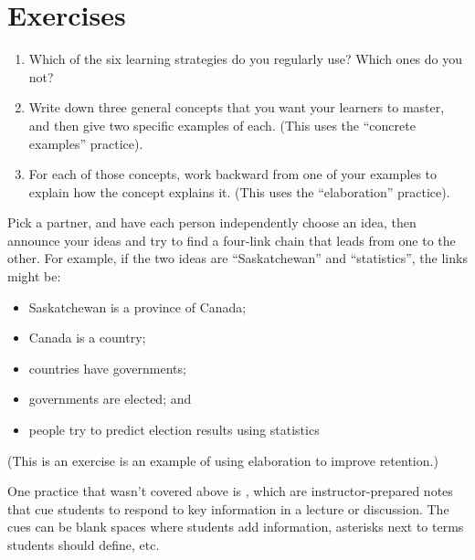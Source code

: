 \section{Exercises}\label{s:individual-exercises}


\begin{enumerate}

\item
  Which of the six learning strategies do you regularly use? Which
  ones do you not?

\item
  Write down three general concepts that you want your learners to
  master, and then give two specific examples of each. (This uses the
  ``concrete examples'' practice).

\item
  For each of those concepts, work backward from one of your examples
  to explain how the concept explains it. (This uses the
  ``elaboration'' practice).

\end{enumerate}


Pick a partner, and have each person independently choose an idea,
then announce your ideas and try to find a four-link chain that leads
from one to the other.  For example, if the two ideas are
``Saskatchewan'' and ``statistics'', the links might be:

\begin{itemize}
\item
  Saskatchewan is a province of Canada;
\item
  Canada is a country;
\item
  countries have governments;
\item
  governments are elected; and
\item
  people try to predict election results using statistics
\end{itemize}

(This is an exercise is an example of using elaboration to improve
retention.)


One practice that wasn't covered above is
, which are instructor-prepared
notes that cue students to respond to key information in a lecture or
discussion.  The cues can be blank spaces where students add
information, asterisks next to terms students should define, etc.


